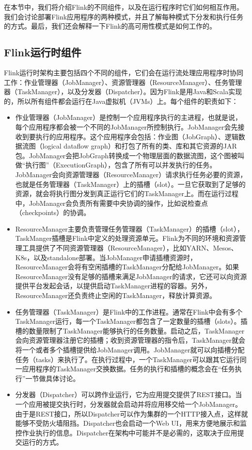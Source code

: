 \documentclass[oneside]{ctexbook}
\begin{document}
在本节中，我们将介绍Flink的不同组件，以及在运行程序时它们如何相互作用。我们会讨论部署Flink应用程序的两种模式，并且了解每种模式下分发和执行任务的方式。最后，我们还会解释一下Flink的高可用性模式是如何工作的。

\subsection{Flink运行时组件}

Flink运行时架构主要包括四个不同的组件，它们会在运行流处理应用程序时协同工作：作业管理器（JobManager）、资源管理器（ResourceManager）、任务管理器（TaskManager），以及分发器（Dispatcher）。因为Flink是用Java和Scala实现的，所以所有组件都会运行在Java虚拟机（JVMs）上。每个组件的职责如下：

\begin{itemize}
  \item 作业管理器（JobManager）是控制一个应用程序执行的主进程，也就是说，每个应用程序都会被一个不同的JobManager所控制执行。JobManager会先接收到要执行的应用程序。这个应用程序会包括：作业图（JobGraph）、逻辑数据流图（logical dataflow graph）和打包了所有的类、库和其它资源的JAR包。JobManager会把JobGraph转换成一个物理层面的数据流图，这个图被叫做“执行图”（ExecutionGraph），包含了所有可以并发执行的任务。JobManager会向资源管理器（ResourceManager）请求执行任务必要的资源，也就是任务管理器（TaskManager）上的插槽（slot）。一旦它获取到了足够的资源，就会将执行图分发到真正运行它们的TaskManager上。而在运行过程中，JobManager会负责所有需要中央协调的操作，比如说检查点（checkpoints）的协调。
  \item ResourceManager主要负责管理任务管理器（TaskManager）的插槽（slot），TaskManger插槽是Flink中定义的处理资源单元。Flink为不同的环境和资源管理工具提供了不同资源管理器（ResourceManager），比如YARN、Mesos、K8s，以及standalone部署。当JobManager申请插槽资源时，ResourceManager会将有空闲插槽的TaskManager分配给JobManager。如果ResourceManager没有足够的插槽来满足JobManager的请求，它还可以向资源提供平台发起会话，以提供启动TaskManager进程的容器。另外，ResourceManager还负责终止空闲的TaskManager，释放计算资源。
  \item 任务管理器（TaskManager）是Flink中的工作进程。通常在Flink中会有多个TaskManager运行，每一个TaskManager都包含了一定数量的插槽（slots）。插槽的数量限制了TaskManager能够执行的任务数量。启动之后，TaskManager会向资源管理器注册它的插槽；收到资源管理器的指令后，TaskManager就会将一个或者多个插槽提供给JobManager调用。JobManager就可以向插槽分配任务（tasks）来执行了。在执行过程中，一个TaskManager可以跟其它运行同一应用程序的TaskManager交换数据。任务的执行和插槽的概念会在“任务执行”一节做具体讨论。
  \item 分发器（Dispatcher）可以跨作业运行，它为应用提交提供了REST接口。当一个应用被提交执行时，分发器就会启动并将应用移交给一个JobManager。由于是REST接口，所以Dispatcher可以作为集群的一个HTTP接入点，这样就能够不受防火墙阻挡。Dispatcher也会启动一个Web UI，用来方便地展示和监控作业执行的信息。Dispatcher在架构中可能并不是必需的，这取决于应用提交运行的方式。
\end{itemize}
\end{document}
